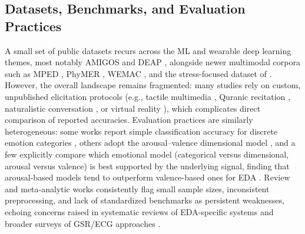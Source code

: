 \subsection{Datasets, Benchmarks, and Evaluation Practices}
A small set of public datasets recurs across the ML and wearable deep learning themes, most notably AMIGOS \cite{granados2018deep} and DEAP \cite{kumar2024machine}, alongside newer multimodal corpora such as MPED \cite{song2019mped}, PhyMER \cite{pant2023phymer}, WEMAC \cite{a2022wemac}, and the stress-focused dataset of \cite{hosseini2022multimodal}. However, the overall landscape remains fragmented: many studies rely on custom, unpublished elicitation protocols (e.g., tactile multimedia \cite{raheel2020physiological}, Quranic recitation \cite{darabkh2026exploring}, naturalistic conversation \cite{zitouni2022lstm}, or virtual reality \cite{marinmorales2018affective,polo2025advancing,anon2025performance}), which complicates direct comparison of reported accuracies. Evaluation practices are similarly heterogeneous: some works report simple classification accuracy for discrete emotion categories \cite{fan2023human,setyohadi2018galvanic}, others adopt the arousal--valence dimensional model \cite{veeranki2024comparison,ayata2020emotion,moontaha2023online}, and a few explicitly compare which emotional model (categorical versus dimensional, arousal versus valence) is best supported by the underlying signal, finding that arousal-based models tend to outperform valence-based ones for EDA \cite{damelio2023exploring,damelio2025emotion}. Review and meta-analytic works \cite{khare2023emotion,shu2018review,egger2019emotion,saganowski2022emotion,c2026survey} consistently flag small sample sizes, inconsistent preprocessing, and lack of standardized benchmarks as persistent weaknesses, echoing concerns raised in systematic reviews of EDA-specific systems \cite{damelio2025emotion} and broader surveys of GSR/ECG approaches \cite{bulagang2020review}.


